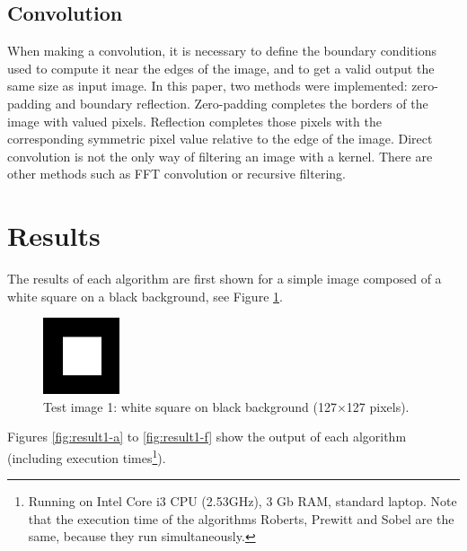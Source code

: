 \documentclass{ipol}
\numberwithin{equation}{section}
\numberwithin{table}{section}
\begin{document}

\subsection{Convolution}

When making a convolution, it is necessary to define the boundary conditions used to compute it near the edges of the image, and to get a valid output the same size as input image. In this paper, 
two methods were implemented: zero-padding and boundary reflection. Zero-padding completes the borders of the image with valued pixels. Reflection completes those pixels with the corresponding symmetric pixel value  relative to the edge of the image. Direct convolution is not the only way of filtering an image with a kernel. There are other methods such as FFT convolution or recursive filtering.%




\section{Results}
\label{sec:results}

The results of each algorithm are first shown for a simple image composed of a white square on a black background, see Figure \ref{fig:original1}. 

\begin{figure}[h!]
	\centering
	\includegraphics[width=0.2\textwidth]{results/square127.png}
	\caption{Test image 1: white square on black background (127$\times$127 pixels).}
	\label{fig:original1}
\end{figure}

Figures \ref{fig:result1-a} to \ref{fig:result1-f} show the output of each algorithm (including execution times\footnote{Running on Intel Core i3 CPU (2.53GHz), 3 Gb RAM, standard laptop. Note that the execution time of the algorithms Roberts, Prewitt and Sobel are the same, because they run simultaneously.}). 
\end{document}
